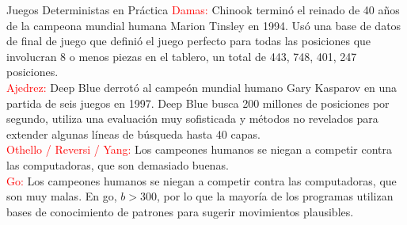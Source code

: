 \begin{frame}{Juegos Deterministas en Práctica}
\small{
	\textcolor{red}{Damas:} Chinook terminó el reinado de 40 años de la
	campeona mundial humana Marion Tinsley en 1994. Usó una base de datos
	de final de juego que definió el juego perfecto para todas las
	posiciones que involucran 8 o menos piezas en el tablero, un total de
	443, 748, 401, 247 posiciones.\\[0.3cm]

	\textcolor{red}{Ajedrez:} Deep Blue derrotó al campeón mundial humano
	Gary Kasparov en una partida de seis juegos en 1997. Deep Blue busca
	200 millones de posiciones por segundo, utiliza una evaluación muy
	sofisticada y métodos no revelados para extender algunas líneas de
	búsqueda hasta 40 capas.\\[0.3cm]

	\textcolor{red}{Othello / Reversi / Yang:} Los campeones humanos se
	niegan a competir contra las computadoras, que son demasiado
	buenas.\\[0.3cm]

	\textcolor{red}{Go:} Los campeones humanos se niegan a competir contra
	las computadoras, que son muy malas. En go, $b > 300$, por lo que la
	mayoría de los programas utilizan bases de conocimiento de patrones
	para sugerir movimientos plausibles.
}    
\end{frame}{}
